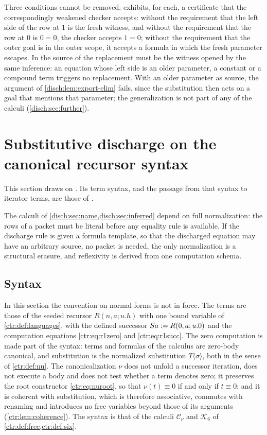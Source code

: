 \begin{remark}
\label{disch:rem:conditions}
Three conditions cannot be removed.  exhibits,
for each, a certificate that the correspondingly weakened checker accepts:
without the requirement that the left side of the row at $1$ is the fresh
witness, and without the requirement that the row at $0$ is $0=0$, the
checker accepts $1=0$; without the requirement that the outer goal is in
the outer scope, it accepts a formula in which the fresh parameter
escapes. In  the source of the replacement must be
the witness opened by the same inference: an equation whose left side is
an older parameter, a constant or a compound term triggers no replacement.
With an older parameter as source, the argument of
\cref{disch:lem:export-elim} fails, since the substitution then acts on a
goal that mentions that parameter; the generalization is not part of any
of the calculi (\cref{disch:sec:further}).
\end{remark}

\section{Substitutive discharge on the canonical recursor syntax}
\label{disch:sec:subst}

This section draws on . Its term syntax, and
the passage from that syntax to iterator terms, are those of
.

The calculi of \cref{disch:sec:name,disch:sec:inferred} depend on full
normalization: the rows of a packet must be literal before any equality
rule is available. If the discharge rule is given a formula template, so
that the discharged equation may have an arbitrary source, no packet is
needed, the only normalization is a structural erasure, and reflexivity is
derived from one computation schema.

\subsection{Syntax}

In this section the convention on normal forms is not in force. The terms
are those of the seeded recursor $R(n,a;u.h)$ with one bound variable of
\cref{ctr:def:languages}, with the defined successor
$S a\mathrel{:=} R(0,a;u.0)$ and the computation equations
\eqref{ctr:eq:r1zero} and \eqref{ctr:eq:r1succ}. The zero computation is
made part of the syntax: terms and formulas of the calculus are zero-body
canonical, and substitution is the normalized substitution
$T\langle\sigma\rangle$, both in the sense of \cref{ctr:def:nu}. The
canonicalization $\nu$ does not unfold a successor iteration, does not
execute a body and does not test whether a term denotes zero; it preserves
the root constructor \eqref{ctr:eq:nuroot}, so that $\nu(t)\equiv 0$ if
and only if $t\equiv 0$; and it is coherent with substitution, which is
therefore associative, commutes with renaming and introduces no free
variables beyond those of its arguments (\cref{ctr:lem:coherence}). The
syntax is that of the calculi $\mathcal C_\nu$ and $\mathcal K_6$ of
\cref{ctr:def:free,ctr:def:six}.


